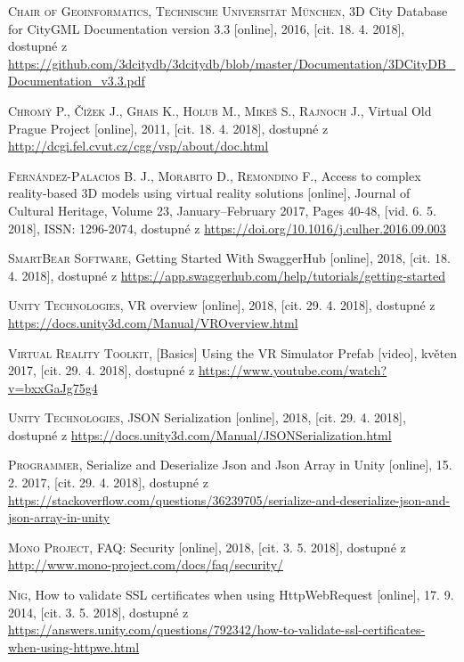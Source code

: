 \documentclass[thesis=B,czech]{FITthesis}[2012/06/26]
\begin{document}
\begin{thebibliography}{999}

  \textsc{Chair of Geoinformatics, Technische Universität München},
  3D City Database for CityGML Documentation version 3.3 [online], 2016,
  [cit. 18. 4. 2018],
  dostupné z \url{https://github.com/3dcitydb/3dcitydb/blob/master/Documentation/3DCityDB_Documentation_v3.3.pdf}
  
  \textsc{Chromý P., Čižek J., Ghais K., Holub M., Mikeš S., Rajnoch J.},
  Virtual Old Prague Project [online], 2011,
  [cit. 18. 4. 2018],
  dostupné z \url{http://dcgi.fel.cvut.cz/cgg/vsp/about/doc.html}
  
  
  \textsc{Fernández-Palacios B. J., Morabito D., Remondino F.},
  Access to complex reality-based 3D models using virtual reality
solutions [online],
  Journal of Cultural Heritage, Volume 23, January–February 2017, Pages 40-48,
  [vid. 6. 5. 2018],
  ISSN: 1296-2074,
  dostupné z \url{https://doi.org/10.1016/j.culher.2016.09.003}
  
  
  \textsc{SmartBear Software},
  Getting Started With SwaggerHub [online], 2018,
  [cit. 18. 4. 2018],
  dostupné z \url{https://app.swaggerhub.com/help/tutorials/getting-started}
  
  
  
  \textsc{Unity Technologies},
  VR overview [online], 2018,
  [cit. 29. 4. 2018],
  dostupné z \url{https://docs.unity3d.com/Manual/VROverview.html}
  
  \textsc{Virtual Reality Toolkit},
  [Basics] Using the VR Simulator Prefab [video], květen 2017,
  [cit. 29. 4. 2018],
  dostupné z \url{https://www.youtube.com/watch?v=bxxGaJg75g4}
  
  
  \textsc{Unity Technologies},
  JSON Serialization [online], 2018,
  [cit. 29. 4. 2018],
  dostupné z \url{https://docs.unity3d.com/Manual/JSONSerialization.html}
  
  \textsc{Programmer},
  Serialize and Deserialize Json and Json Array in Unity [online], 15. 2. 2017,
  [cit. 29. 4. 2018],
  dostupné z \url{https://stackoverflow.com/questions/36239705/serialize-and-deserialize-json-and-json-array-in-unity}
 
  \textsc{Mono Project},
  FAQ: Security [online], 2018,
  [cit. 3. 5. 2018],
  dostupné z \url{http://www.mono-project.com/docs/faq/security/}
  
  
  \textsc{Nig},
  How to validate SSL certificates when using HttpWebRequest [online], 17. 9. 2014,
  [cit. 3. 5. 2018],
  dostupné z \url{https://answers.unity.com/questions/792342/how-to-validate-ssl-certificates-when-using-httpwe.html}



\end{thebibliography}
\end{document}
